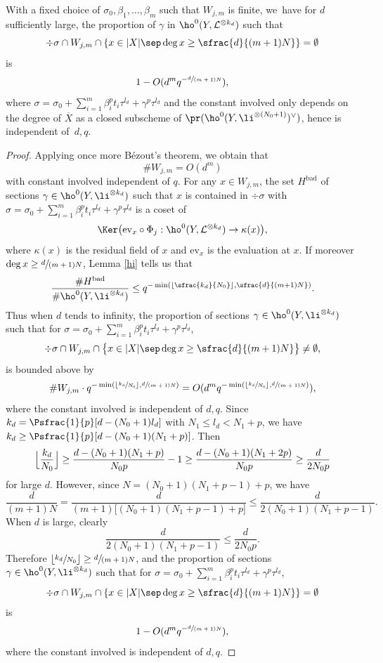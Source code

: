 \begin{lem}\label{finiteset}
With a fixed choice of $\sigma_0, \beta_1,\dots, \beta_m$ such that $W_{j,m}$ is finite, we~have for $d$ sufficiently large, the proportion of $\gamma $ in $\ho^0(Y,\mathcal{L}^{\otimes k_d})$ such that
\[
\div \sigma\cap W_{j,m}\cap \left\{ x\in |X|\sep \deg x\geq\sfrac{d}{(m+1)N} \right\}=\emptyset
\]
is
\[
1-O(d^m q^{-\sfrac{d}{(m+1)N}}),
\]
where $\sigma=\sigma_0+\sum_{i=1}^{m} \beta_i^pt_i\tau^{l_d}+\gamma^p\tau^{l_d}$ and the constant involved only depends on the degree of $\overline{X}$ as a closed subscheme of $\pr(\ho^0(Y, \li^{\otimes (N_0+1)})^{\vee})$, hence is independent of~$d,q$.
\end{lem}
\begin{proof}[Proof]
Applying once more Bézout's theorem, we obtain that
\[
\#W_{j,m}=O(d^m)
\]
with constant involved independent of $q$. For any $x\in W_{j,m}$, the set $H^{\mathrm{bad}}$ of sections $\gamma\in \ho^0(Y, \li^{\otimes k_d})$ such that $x$ is contained in $\div \sigma$ with $\sigma=\sigma_0+\sum_{i=1}^{m} \beta_i^pt_i\tau^{l_d}+\gamma^p\tau^{l_d}$ is a coset of
\[
\Ker \bigl(\mathrm{ev}_x\circ \Phi_j: \ho^0(Y, \mathcal{L}^{\otimes k_d})\to \kappa(x) \bigr),
\]
where $\kappa(x)$ is the residual field of $x$ and $\mathrm{ev}_x$ is the evaluation at $x$. If moreover $\deg x\geq\sfrac{d}{(m+1)N}$, Lemma \ref{hi} tells us that
\[
\frac{\#H^{\mathrm{bad}}}{\#\ho^0(Y, \li^{\otimes k_d})} \leq q^{-\min(\lfloor\sfrac{k_d}{N_0}\rfloor, \sfrac{d}{(m+1)N})}.
\]
Thus when $d$ tends to infinity, the proportion of sections $\gamma \in \ho^0(Y, \li^{\otimes k_d})$ such that for $\sigma=\sigma_0+\sum_{i=1}^{m} \beta_i^pt_i\tau^{l_d}+\gamma^p\tau^{l_d}$,
\[
\div \sigma\cap W_{j,m}\cap \bigl\{ x\in |X|\sep \deg x\geq\sfrac{d}{(m+1)N} \bigr\}\not=\emptyset,
\]
is bounded above by
\[
\#W_{j,m}\cdot q^{-\min(\lfloor\sfrac{k_d}{N_0}\rfloor, \sfrac{d}{(m+1)N})}= O(d^m q^{-\min(\lfloor\sfrac{k_d}{N_0}\rfloor, \sfrac{d}{(m+1)N})}),
\]
where the constant involved is independent of $d,q$. Since $k_d=\Psfrac{1}{p}[d-(N_0+1)l_d]$ with $N_1\leq l_d< N_1+p$, we have $k_d\geq \Psfrac{1}{p}[d-(N_0+1)(N_1+p)]$. Then
\[
\Bigl\lfloor\frac{k_d}{N_0}\Bigr\rfloor\geq \frac{d-(N_0+1)(N_1+p)}{N_0 p}-1\geq \frac{d-(N_0+1)(N_1+2p)}{N_0 p}\geq \frac{d}{2N_0p}
\]
for large $d$. However, since $N= (N_0+1)(N_1+p-1)+p$, we have
\[
\frac{d}{(m+1)N}= \frac{d}{(m+1)\big[(N_0+1)(N_1+p-1)+p\big]}\leq \frac{d}{2(N_0+1)(N_1+p-1)}.
\]
When $d$ is large, clearly
\[
\frac{d}{2(N_0+1)(N_1+p-1)}\leq \frac{d}{2N_0p}.
\]
Therefore $\lfloor\sfrac{k_d}{N_0}\rfloor\geq \sfrac{d}{(m+1)N}$, and the proportion of sections $\gamma \in \ho^0(Y, \li^{\otimes k_d})$ such that for $\sigma=\sigma_0+\sum_{i=1}^{m} \beta_i^pt_i\tau^{l_d}+\gamma^p\tau^{l_d}$,
\[
\div \sigma\cap W_{j,m}\cap \{ x\in |X|\sep \deg x\geq\sfrac{d}{(m+1)N} \}=\emptyset
\]
is
\[
1-O(d^m q^{-\sfrac{d}{(m+1)N}}),
\]
where the constant involved is independent of $d,q$.
\end{proof}

